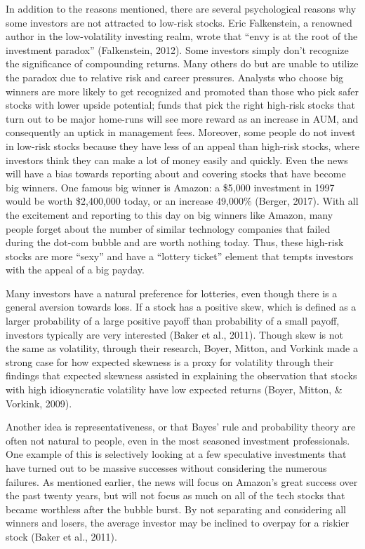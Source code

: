 \documentclass[12pt,twoside]{reedthesis}
\theoremstyle{definition}
\theoremstyle{definition}
\theoremstyle{definition}
\theoremstyle{remark}
\begin{document}
In addition to the reasons mentioned, there are several psychological
reasons why some investors are not attracted to low-risk stocks. Eric
Falkenstein, a renowned author in the low-volatility investing realm,
wrote that ``envy is at the root of the investment paradox''
(Falkenstein, 2012). Some investors simply don't recognize the
significance of compounding returns. Many others do but are unable to
utilize the paradox due to relative risk and career pressures. Analysts
who choose big winners are more likely to get recognized and promoted
than those who pick safer stocks with lower upside potential; funds that
pick the right high-risk stocks that turn out to be major home-runs will
see more reward as an increase in AUM, and consequently an uptick in
management fees. Moreover, some people do not invest in low-risk stocks
because they have less of an appeal than high-risk stocks, where
investors think they can make a lot of money easily and quickly. Even
the news will have a bias towards reporting about and covering stocks
that have become big winners. One famous big winner is Amazon: a \$5,000
investment in 1997 would be worth \$2,400,000 today, or an increase
49,000\% (Berger, 2017). With all the excitement and reporting to this
day on big winners like Amazon, many people forget about the number of
similar technology companies that failed during the dot-com bubble and
are worth nothing today. Thus, these high-risk stocks are more ``sexy''
and have a ``lottery ticket'' element that tempts investors with the
appeal of a big payday.

Many investors have a natural preference for lotteries, even though
there is a general aversion towards loss. If a stock has a positive
skew, which is defined as a larger probability of a large positive
payoff than probability of a small payoff, investors typically are very
interested (Baker et al., 2011). Though skew is not the same as
volatility, through their research, Boyer, Mitton, and Vorkink made a
strong case for how expected skewness is a proxy for volatility through
their findings that expected skewness assisted in explaining the
observation that stocks with high idiosyncratic volatility have low
expected returns (Boyer, Mitton, \& Vorkink, 2009).

Another idea is representativeness, or that Bayes' rule and probability
theory are often not natural to people, even in the most seasoned
investment professionals. One example of this is selectively looking at
a few speculative investments that have turned out to be massive
successes without considering the numerous failures. As mentioned
earlier, the news will focus on Amazon's great success over the past
twenty years, but will not focus as much on all of the tech stocks that
became worthless after the bubble burst. By not separating and
considering all winners and losers, the average investor may be inclined
to overpay for a riskier stock (Baker et al., 2011).
\end{document}
